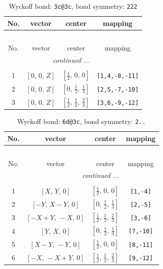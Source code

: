 \documentclass[fleqn,8pt]{jsarticle}
\begin{document}
\renewcommand{\arraystretch}{1.2}
\begin{longtable}{cccc}
\caption{Wyckoff bond: {\tt 3c@3c}, bond symmetry: {\tt 222}}
 \\
 \hline \hline
No. & vector & center & mapping \\ \hline \endfirsthead

\multicolumn{3}{l}{\tablename\ \thetable{}} \\
 \hline \hline
No. & vector & center & mapping \\ \hline \endhead

 \hline \hline
\multicolumn{3}{r}{\footnotesize\it continued ...} \\ \endfoot

 \hline \hline
\multicolumn{3}{r}{} \\ \endlastfoot

1 & $\left[ 0,\, 0,\, Z \right]$ & $\left[ \frac{1}{2},\, 0,\, 0 \right]$ & {\tt [1,4,-8,-11]} \\ \hline
2 & $\left[ 0,\, 0,\, Z \right]$ & $\left[ 0,\, \frac{1}{2},\, \frac{1}{3} \right]$ & {\tt [2,5,-7,-10]} \\ \hline
3 & $\left[ 0,\, 0,\, Z \right]$ & $\left[ \frac{1}{2},\, \frac{1}{2},\, \frac{2}{3} \right]$ & {\tt [3,6,-9,-12]} \\
\end{longtable}
\renewcommand{\arraystretch}{1.2}
\begin{longtable}{cccc}
\caption{Wyckoff bond: {\tt 6d@3c}, bond symmetry: {\tt 2..}}
 \\
 \hline \hline
No. & vector & center & mapping \\ \hline \endfirsthead

\multicolumn{3}{l}{\tablename\ \thetable{}} \\
 \hline \hline
No. & vector & center & mapping \\ \hline \endhead

 \hline \hline
\multicolumn{3}{r}{\footnotesize\it continued ...} \\ \endfoot

 \hline \hline
\multicolumn{3}{r}{} \\ \endlastfoot

1 & $\left[ X,\, Y,\, 0 \right]$ & $\left[ \frac{1}{2},\, 0,\, 0 \right]$ & {\tt [1,-4]} \\ \hline
2 & $\left[ - Y,\, X - Y,\, 0 \right]$ & $\left[ 0,\, \frac{1}{2},\, \frac{1}{3} \right]$ & {\tt [2,-5]} \\ \hline
3 & $\left[ - X + Y,\, - X,\, 0 \right]$ & $\left[ \frac{1}{2},\, \frac{1}{2},\, \frac{2}{3} \right]$ & {\tt [3,-6]} \\ \hline
4 & $\left[ Y,\, X,\, 0 \right]$ & $\left[ 0,\, \frac{1}{2},\, \frac{1}{3} \right]$ & {\tt [7,-10]} \\ \hline
5 & $\left[ X - Y,\, - Y,\, 0 \right]$ & $\left[ \frac{1}{2},\, 0,\, 0 \right]$ & {\tt [8,-11]} \\ \hline
6 & $\left[ - X,\, - X + Y,\, 0 \right]$ & $\left[ \frac{1}{2},\, \frac{1}{2},\, \frac{2}{3} \right]$ & {\tt [9,-12]} \\
\end{longtable}
\end{document}
